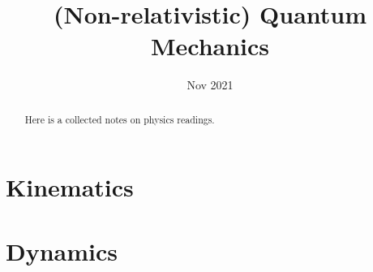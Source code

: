 \documentclass[10pt]{scrartcl}
\begin{document}
	\title{(Non-relativistic) Quantum Mechanics} %
	\date{Nov 2021}
	\maketitle
	
	\begin{abstract}
		\sffamily\small
		Here is a collected notes on physics readings.
	\end{abstract}
	
	\vspace{1em}
	
	\tableofcontents
	\newpage

	
\section{Kinematics}
\newpage
\section{Dynamics}
\end{document}
